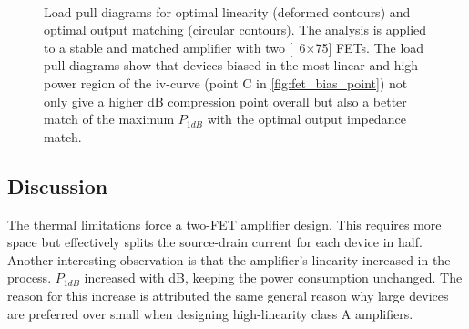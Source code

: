 				\begin{figure}[h!]
					\centering
					 \\
					\caption[Load pull diagrams for IF amplifier 2.]{Load pull diagrams for optimal linearity (deformed contours) and optimal output matching (circular contours). The analysis is applied to a stable and matched amplifier with two \unit[6$\times$75]{\mum} FETs. The load pull diagrams show that devices biased in the most linear and high power region of the iv-curve (point C in \autoref{fig:fet_bias_point}) not only give a higher \unit[1]{dB} compression point overall but also a better match of the maximum $P_{1dB}$ with the optimal output impedance match.}\label{fig:if2lp}
				\end{figure}

		\subsection{Discussion}
			The thermal limitations force a two-FET amplifier design. This requires more space but effectively splits the source-drain current for each device in half. Another interesting observation is that the amplifier's linearity increased in the process. $P_{1dB}$ increased with \unit[4]{dB}, keeping the power consumption unchanged. The reason for this increase is attributed the same general reason why large devices are preferred over small when designing high-linearity class A amplifiers.

